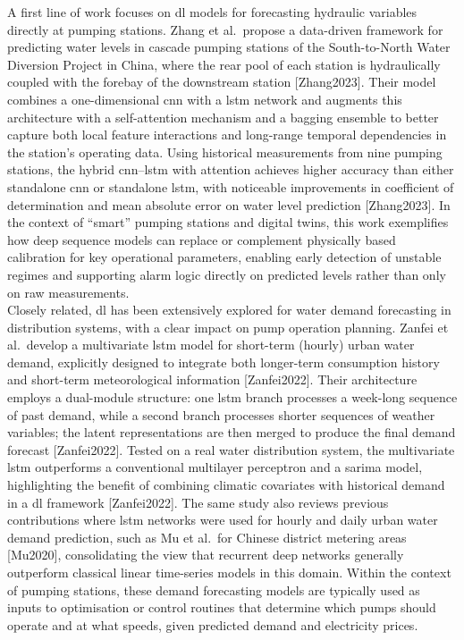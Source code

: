 A first line of work focuses on \acrshort{dl} models for forecasting hydraulic variables directly at pumping stations. Zhang et al.\ propose a data-driven framework for predicting water levels in cascade pumping stations of the South-to-North Water Diversion Project in China, where the rear pool of each station is hydraulically coupled with the forebay of the downstream station [Zhang2023]. Their model combines a one-dimensional \acrfull{cnn} with a \acrshort{lstm} network and augments this architecture with a self-attention mechanism and a bagging ensemble to better capture both local feature interactions and long-range temporal dependencies in the station’s operating data. Using historical measurements from nine pumping stations, the hybrid \acrshort{cnn}–\acrshort{lstm} with attention achieves higher accuracy than either standalone \acrshort{cnn} or standalone \acrshort{lstm}, with noticeable improvements in coefficient of determination and mean absolute error on water level prediction [Zhang2023]. In the context of “smart” pumping stations and digital twins, this work exemplifies how deep sequence models can replace or complement physically based calibration for key operational parameters, enabling early detection of unstable regimes and supporting alarm logic directly on predicted levels rather than only on raw measurements.\\ 

Closely related, \acrshort{dl} has been extensively explored for water demand forecasting in distribution systems, with a clear impact on pump operation planning. Zanfei et al.\ develop a multivariate \acrshort{lstm} model for short-term (hourly) urban water demand, explicitly designed to integrate both longer-term consumption history and short-term meteorological information [Zanfei2022]. Their architecture employs a dual-module structure: one \acrshort{lstm} branch processes a week-long sequence of past demand, while a second branch processes shorter sequences of weather variables; the latent representations are then merged to produce the final demand forecast [Zanfei2022]. Tested on a real water distribution system, the multivariate \acrshort{lstm} outperforms a conventional multilayer perceptron and a \acrfull{sarima} model, highlighting the benefit of combining climatic covariates with historical demand in a \acrshort{dl} framework [Zanfei2022]. The same study also reviews previous contributions where \acrshort{lstm} networks were used for hourly and daily urban water demand prediction, such as Mu et al.\ for Chinese district metering areas [Mu2020], consolidating the view that recurrent deep networks generally outperform classical linear time-series models in this domain. Within the context of pumping stations, these demand forecasting models are typically used as inputs to optimisation or control routines that determine which pumps should operate and at what speeds, given predicted demand and electricity prices.\\


